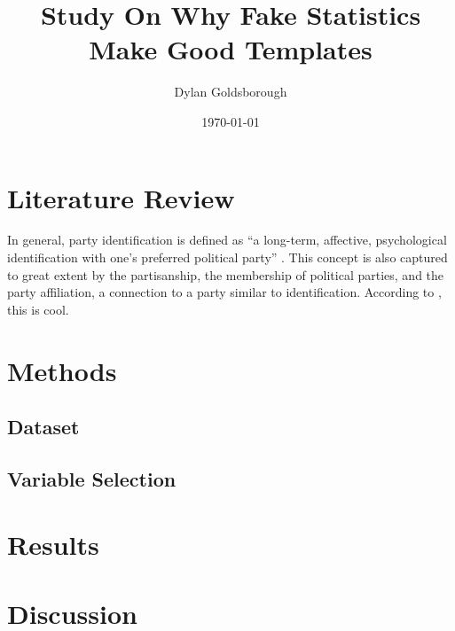 \documentclass{stats_apa_style2}
\title{Study On Why Fake Statistics Make Good Templates}
\author{Dylan Goldsborough}
\date{\today}
\begin{document}
\maketitle

\begin{abstract}
\noindent
\lipsum[3]
\end{abstract}

\newpage

\section*{Literature Review}

\lipsum[2-3] 
In general, party identification is defined as “a long-term, affective, psychological identification with one’s preferred political party” \cite[p.20]{mcboat2016cool}. This concept is also captured to great extent by the partisanship, the membership of political parties, and the party affiliation, a connection to a party similar to identification. According to , this is cool.

\section*{Methods}

\subsection*{Dataset} 

\lipsum[2-3]

\subsection*{Variable Selection}

\lipsum[2-3]

\section*{Results}

\lipsum[2-3]

\section*{Discussion}

\lipsum[2-3]

\newpage



\end{document}
